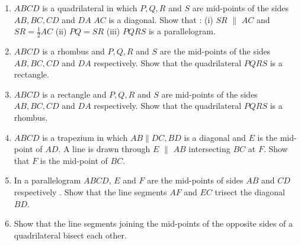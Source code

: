\begin{enumerate}[label=\arabic*.,ref=\thesubsection.\theenumi]
\item $ABCD$ is a quadrilateral in which $P, Q, R$ and $S$ are mid-points of the sides $AB, BC, CD$ and $DA$ $AC$ is a diagonal. Show that :
(i) $SR$  $\parallel$  $AC$ and $SR =\frac{1}{ 2}AC$
(ii) $PQ = SR$ (iii)  $PQRS$  is a parallelogram.
\item $ABCD$ is a rhombus and  $P, Q, R$ and $S$  are the mid-points of the sides  $AB, BC, CD$ and $DA$ respectively. Show that the quadrilateral  $PQRS$  is a rectangle.
\item $ABCD$ is a rectangle and  $P, Q, R$ and $S$  are mid-points of the sides  $AB, BC, CD$ and $DA$ respectively. Show that the quadrilateral  $PQRS$  is a rhombus.
\item $ABCD$ is a trapezium in which $AB  \parallel  DC, BD$ is a diagonal and $E$ is the mid-point of $AD$. A line is drawn through $E$ $\parallel$  $AB$ intersecting $BC$ at $F$. Show that $F$ is the mid-point of $BC$.
\item In a parallelogram $ABCD$, $E$ and $F$ are the mid-points of sides $AB$ and $CD$ respectively . Show that the line segments $AF$ and $EC$ trisect the diagonal $BD$.
\item Show that the line segments joining the mid-points of the opposite sides of a quadrilateral bisect each other.

\end{enumerate}

